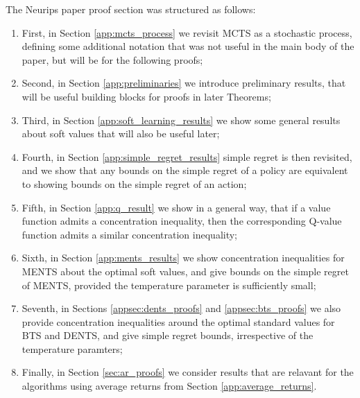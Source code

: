     The Neurips paper proof section was structured as follows:
    \begin{enumerate}
        \item First, in Section \ref{app:mcts_process} we revisit MCTS as a stochastic process, defining some additional notation that was not useful in the main body of the paper, but will be for the following proofs;
        \item Second, in Section \ref{app:preliminaries} we introduce preliminary results, that will be useful building blocks for proofs in later Theorems;
        \item Third, in Section \ref{app:soft_learning_results} we show some general results about soft values that will also be useful later;
        \item Fourth, in Section \ref{app:simple_regret_results} simple regret is then revisited, and we show that any bounds on the simple regret of a policy are equivalent to showing bounds on the simple regret of an action;
        \item Fifth, in Section \ref{app:q_result} we show in a general way, that if a value function admits a concentration inequality, then the corresponding Q-value function admits a similar concentration inequality;
        \item Sixth, in Section \ref{app:ments_results} we show concentration inequalities for MENTS about the optimal soft values, and give bounds on the simple regret of MENTS, provided the temperature parameter is sufficiently small;
        \item Seventh, in Sections \ref{appsec:dents_proofs} and \ref{appsec:bts_proofs} we also provide concentration inequalities around the optimal standard values for BTS and DENTS, and give simple regret bounds, irrespective of the temperature paramters;
        \item Finally, in Section \ref{sec:ar_proofs} we consider results that are relavant for the algorithms using average returns from Section \ref{app:average_returns}.
    \end{enumerate}



















